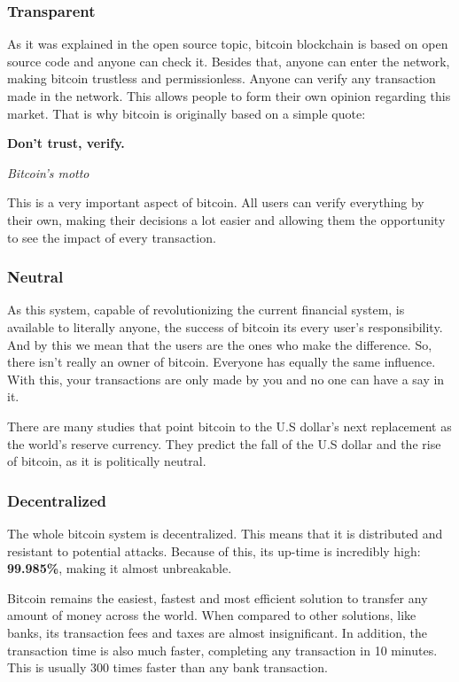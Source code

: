 \documentclass{article}
\newcommand\tab[1][1cm]{\hspace*{#1}}
\begin{document}
\subsubsection{Transparent}

\tab As it was explained in the open source topic, bitcoin blockchain is based on open source code and anyone can check it. Besides that, anyone can enter the network, making bitcoin trustless and permissionless. Anyone can verify any transaction made in the network. This allows people to form their own opinion regarding this market. That is why bitcoin is originally based on a simple quote:

\renewcommand{\epigraphflush}{center}
\epigraph{\textbf{Don't trust, verify.}}{\textit{Bitcoin's motto}}

This is a very important aspect of bitcoin. All users can verify everything by their own, making their decisions a lot easier and allowing them the opportunity to see the impact of every transaction.

\subsubsection{Neutral}

\tab As this system, capable of revolutionizing the current financial system, is available to literally anyone, the success of bitcoin its every user's responsibility. And by this we mean that the users are the ones who make the difference. So, there isn't really an owner of bitcoin. Everyone has equally the same influence. With this, your transactions are only made by you and no one can have a say in it. 

There are many studies that point bitcoin to the U.S dollar's next replacement as the world's reserve currency. They predict the fall of the U.S dollar and the rise of bitcoin, as it is politically neutral. 

\subsubsection{Decentralized}

\tab The whole bitcoin system is decentralized. This means that it is distributed and resistant to potential attacks. Because of this, its up-time is incredibly high: \textbf{99.985\%}, making it almost unbreakable. 

Bitcoin remains the easiest, fastest and most efficient solution to transfer any amount of money across the world. When compared to other solutions, like banks, its transaction fees and taxes are almost insignificant. In addition, the transaction time is also much faster, completing any transaction in 10 minutes. This is usually 300 times faster than any bank transaction. 
\end{document}
